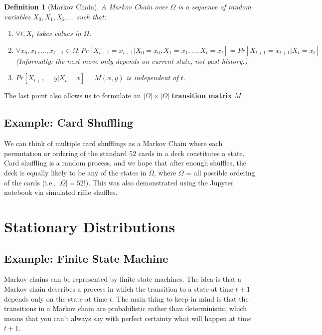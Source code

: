 \documentclass[twoside]{article}
\newtheorem{definition}[theorem]{Definition}
\begin{document}
\begin{definition}[Markov Chain]
   A Markov Chain over $\Omega$ is a sequence of random variables $X_0, X_1, X_2, ...$ such that:
   \begin{enumerate}
      \item $\forall t, X_t$ takes values in $\Omega$.
      \item $\forall x_0, x_1, ..., x_{t+1} \in \Omega: Pr[X_{t+1} = x_{t+1}|X_0 = x_0, X_1 = x_1, ..., X_t = x_t] = Pr[X_{t+1} = x_{t+1}|X_t = x_t]$ \\
      (Informally: the next move only depends on current state, not past history.)
      \item $Pr[X_{t+1} = y|X_t = x] = M(x, y)$ is independent of $t$.
   \end{enumerate}
\end{definition}

The last point also allows us to formulate an $|\Omega| \times |\Omega|$ \textbf{transition matrix} $M$.

\subsection{Example: Card Shuffling}

We can think of multiple card shufflings as a Markov Chain where each permutation or ordering of the standard 52 cards in a deck constitutes a state. Card shuffling is a random process, and we hope that after enough shuffles, the deck is equally likely to be any of the states in $\Omega$, where $\Omega$ = all possible ordering of the cards (i.e., $|\Omega| = 52!$). This was also demonstrated using the Jupyter notebook via simulated riffle shuffles.


\section{Stationary Distributions}

\subsection{Example: Finite State Machine}
Markov chains can be represented by finite state machines. The idea is that a Markov chain describes a process in which the transition to a state at time $t+1$ depends only on the state at time $t$. The main thing to keep in mind is that the transitions in a Markov chain are probabilistic rather than deterministic, which means that you can't always say with perfect certainty what will happen at time $t+1$.
\end{document}
